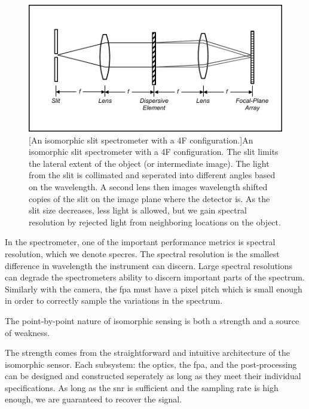 \begin{figure}
    \includegraphics[scale=1]{slitspectrometer}
    [An isomorphic slit spectrometer with a 4F configuration.]{An isomorphic slit spectrometer with a 4F configuration. The slit limits the lateral extent of the object (or intermediate image). The light from the slit is collimated and seperated into different angles based on the wavelength. A second lens then images wavelength shifted copies of the slit on the image plane where the detector is. As the slit size decreases, less light is allowed, but we gain spectral resolution by rejected light from neighboring locations on the object. }
    \label{fig:slitspectrometer}
\end{figure}

In the spectrometer, one of the important performance metrics is \gls{spectral resolution}, which we denote \gls{specres}. The spectral resolution is the smallest difference in wavelength the instrument can discern. Large spectral resolutions can degrade the spectrometers ability to discern important parts of the spectrum. Similarly with the camera, the \gls{fpa} must have a \gls{pixel pitch} which is small enough in order to correctly sample the variations in the spectrum. 

The point-by-point nature of isomorphic sensing is both a strength and a source of weakness. 

The strength comes from the straightforward and intuitive architecture of the isomorphic sensor. Each subsystem: the optics, the \acrfull{fpa}, and the post-processing can be designed and constructed seperately as long as they meet their individual specifications. As long as the \gls{snr} is sufficient and the sampling rate is high enough, we are guaranteed to recover the signal.

